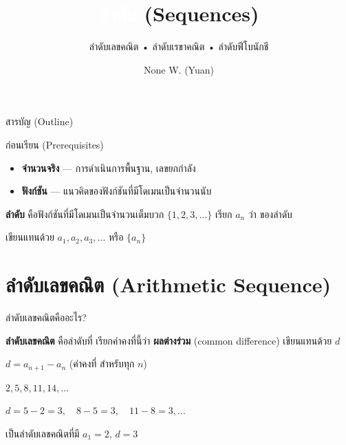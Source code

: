\documentclass[11pt, aspectratio=169]{beamer}
\title[ลำดับ]{\textcolor{white}{ลำดับ} \textcolor{boxBlue!60}{(Sequences)}}
\subtitle{ลำดับเลขคณิต • ลำดับเรขาคณิต • ลำดับฟีโบนักชี }
\author[None W. (Yuan)]{None W. (Yuan)}
\date{}
\begin{document}
\begin{frame}[plain]
  \titlepage
\end{frame}

\begin{frame}{สารบัญ (Outline)}
  \tableofcontents
\end{frame}

\begin{frame}{ก่อนเรียน (Prerequisites)}
  \begin{explanation}
    \begin{itemize}
      \item \textbf{จำนวนจริง} — การดำเนินการพื้นฐาน, เลขยกกำลัง
      \item \textbf{ฟังก์ชัน} — แนวคิดของฟังก์ชันที่มีโดเมนเป็นจำนวนนับ
    \end{itemize}
  \end{explanation}

  \begin{intuition}
    \textbf{ลำดับ} คือฟังก์ชันที่มีโดเมนเป็นจำนวนเต็มบวก $\{1, 2, 3, \ldots\}$
    เรียก $a_n$ ว่า  ของลำดับ

    \medskip
    เขียนแทนด้วย $a_1, a_2, a_3, \ldots$ หรือ $\{a_n\}$
  \end{intuition}
\end{frame}

\section{ลำดับเลขคณิต (Arithmetic Sequence)}

\begin{frame}{ลำดับเลขคณิตคืออะไร?}
  \begin{explanation}[นิยาม]
    \textbf{ลำดับเลขคณิต} คือลำดับที่ 
    เรียกค่าคงที่นี้ว่า \textbf{ผลต่างร่วม} (common difference) เขียนแทนด้วย $d$

    \medskip
    $d = a_{n+1} - a_n$ \quad (ค่าคงที่ สำหรับทุก $n$)
  \end{explanation}

  \begin{exambox}[ตัวอย่าง]
    $2, 5, 8, 11, 14, \ldots$

    \medskip
    $d = 5 - 2 = 3, \quad 8 - 5 = 3, \quad 11 - 8 = 3, \ldots$

    \medskip
    เป็นลำดับเลขคณิตที่มี $a_1 = 2$, $d = 3$
  \end{exambox}
\end{frame}
\end{document}
